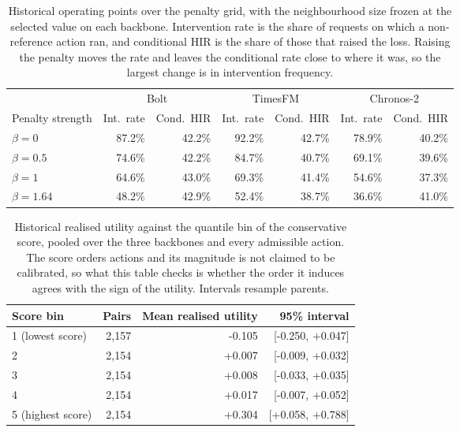 \documentclass{article}
\begin{document}
\begin{table}[htbp]
  \caption{Historical operating points over the penalty grid, with the neighbourhood size frozen at the
  selected value on each backbone. Intervention rate is the share of requests on which a
  non-reference action ran, and conditional HIR is the share of those that raised the loss.
  Raising the penalty moves the rate and leaves the conditional rate close to where it was, so
  the largest change is in intervention frequency.}
  \label{tab:app-operating}
  \centering
  \small
  \setlength{\tabcolsep}{4pt}
\begin{tabular*}{\textwidth}{@{\extracolsep{\fill}}lrrrrrr@{}}
    \toprule
     & \multicolumn{2}{c}{Bolt} & \multicolumn{2}{c}{TimesFM} & \multicolumn{2}{c}{Chronos-2} \\
    \cmidrule(lr){2-3}\cmidrule(lr){4-5}\cmidrule(lr){6-7}
    Penalty strength & Int.\ rate & Cond.\ HIR & Int.\ rate & Cond.\ HIR & Int.\ rate & Cond.\ HIR \\
    \midrule
    $\beta = 0$ & 87.2\% & 42.2\% & 92.2\% & 42.7\% & 78.9\% & 40.2\% \\
    $\beta = 0.5$ & 74.6\% & 42.2\% & 84.7\% & 40.7\% & 69.1\% & 39.6\% \\
    $\beta = 1$ & 64.6\% & 43.0\% & 69.3\% & 41.4\% & 54.6\% & 37.3\% \\
    $\beta = 1.64$ & 48.2\% & 42.9\% & 52.4\% & 38.7\% & 36.6\% & 41.0\% \\
    \bottomrule
  \end{tabular*}
\end{table}

\begin{table}[htbp]
  \caption{Historical realised utility against the quantile bin of the conservative score, pooled over the
  three backbones and every admissible action. The score orders actions and its magnitude is
  not claimed to be calibrated, so what this table checks is whether the order it induces
  agrees with the sign of the utility. Intervals resample parents.}
  \label{tab:app-scorebins}
  \centering
  \small
  \setlength{\tabcolsep}{4pt}
\begin{tabular*}{\textwidth}{@{\extracolsep{\fill}}lrrr@{}}
    \toprule
    Score bin & Pairs & Mean realised utility & 95\% interval \\
    \midrule
    1 (lowest score) & 2,157 & -0.105 & [-0.250, +0.047] \\
    2 & 2,154 & +0.007 & [-0.009, +0.032] \\
    3 & 2,154 & +0.008 & [-0.033, +0.035] \\
    4 & 2,154 & +0.017 & [-0.007, +0.052] \\
    5 (highest score) & 2,154 & +0.304 & [+0.058, +0.788] \\
    \bottomrule
  \end{tabular*}
\end{table}
\end{document}

